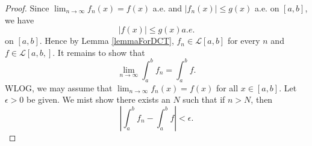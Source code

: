 \documentclass[12pt]{amsart}
\theoremstyle{plain}
\theoremstyle{definition}
\theoremstyle{remark}
\numberwithin{equation}{section}
\numberwithin{thm}{section}
\begin{document}
\begin{proof}
    Since $\lim_{n \to \infty} f_n(x) = f(x)$ a.e. and $|f_n(x)| \leq g(x)$ a.e. on $[a,b]$, we have
    \begin{equation*}
        |f(x)| \leq g(x) a.e.
    \end{equation*}
    on $[a,b]$. Hence by Lemma \ref{lemmaForDCT}, $f_n \in \mathcal{L}[a,b]$ for every $n$ and $f \in \mathcal{L}[a,b,]$. It remains to show that 
    \begin{equation*}
        \lim_{n \to \infty} \int_a^b f_n = \int_a^b f.
    \end{equation*}
    WLOG, we may assume that $\lim_{n \to \infty}f_n(x)=f(x)$ for all $x \in [a,b]$. Let $\epsilon>0$ be given. We mist show there exists an $N$ such that if $n>N$, then 
    \begin{equation*}
        |\int_a^bf_n - \int_a^bf| < \epsilon.        
    \end{equation*}


\end{proof}
\end{document}
